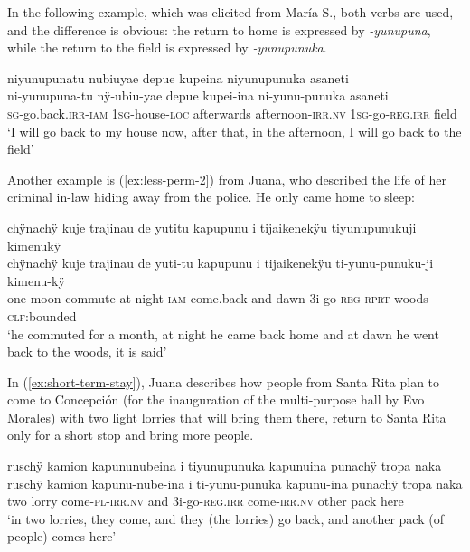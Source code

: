 In the following example, which was elicited from María S., both verbs are used, and the difference is obvious: the return to home is expressed by \textit{-yunupuna}, while the return to the field is expressed by \textit{-yunupunuka}.

\ea\label{ex:less-perm-1}
\begingl
\glpreamble niyunupunatu nubiuyae depue kupeina niyunupunuka asaneti\\
\gla ni-yunupuna-tu nÿ-ubiu-yae depue kupei-ina ni-yunu-punuka asaneti\\
\textsc{sg}-go.back.\textsc{irr}-\textsc{iam} 1\textsc{sg}-house-\textsc{loc} afterwards afternoon-\textsc{irr.nv} 1\textsc{sg}-go-\textsc{reg.irr} field\\
\glft ‘I will go back to my house now, after that, in the afternoon, I will go back to the field’
\endgl
\trailingcitation{[rxx-e181020le]}
\xe

Another example is (\ref{ex:less-perm-2}) from Juana, who described the life of her criminal in-law hiding away from the police. He only came home to sleep:

\ea\label{ex:less-perm-2}
\begingl
\glpreamble chÿnachÿ kuje trajinau de yutitu kapupunu i tijaikenekÿu tiyunupunukuji kimenukÿ\\
\gla chÿnachÿ kuje trajinau {de yuti}-tu kapupunu i tijaikenekÿu ti-yunu-punuku-ji kimenu-kÿ\\
\glb one moon commute {at night}-\textsc{iam} come.back and dawn 3i-go-\textsc{reg}-\textsc{rprt} woods-\textsc{clf:}bounded\\
\glft ‘he commuted for a month, at night he came back home and at dawn he went back to the woods, it is said’
\endgl
\trailingcitation{[jxx-p120430l-2.119-123]}
\xe

In (\ref{ex:short-term-stay}), Juana describes how people from Santa Rita plan to come to Concepción (for the inauguration of the multi-purpose hall by Evo Morales) with two light lorries that will bring them there, return to Santa Rita only for a short stop and bring more people.

\ea\label{ex:short-term-stay}
\begingl 
\glpreamble ruschÿ kamion kapununubeina i tiyunupunuka kapunuina punachÿ tropa naka\\
\gla ruschÿ kamion kapunu-nube-ina i ti-yunu-punuka kapunu-ina punachÿ tropa naka\\ 
\glb two lorry come-\textsc{pl}-\textsc{irr.nv} and 3i-go-\textsc{reg.irr} come-\textsc{irr.nv} other pack here\\ 
\glft ‘in two lorries, they come, and they (the lorries) go back, and another pack (of people) comes here’
\trailingcitation{[jxx-p150920l.080]}
\xe

